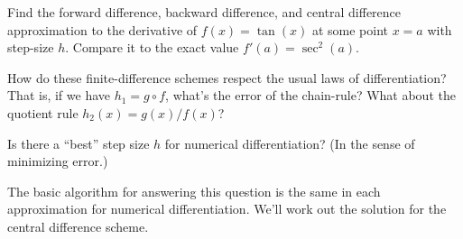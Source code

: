 \begin{xca}
  Find the forward difference, backward difference, and central
  difference approximation to the derivative of $f(x)=\tan(x)$ at some
  point $x=a$ with step-size $h$. Compare it to the exact value $f'(a)=\sec^{2}(a)$.
\end{xca}

\begin{xca}
  How do these finite-difference schemes respect the usual laws of
  differentiation? That is, if we have $h_{1} = g\circ f$, what's the error
  of the chain-rule? What about the quotient rule $h_{2}(x)=g(x)/f(x)$?
\end{xca}

\begin{puzzle}
Is there a ``best'' step size $h$ for numerical differentiation? (In the
sense of minimizing error.)
\end{puzzle}

The basic algorithm for answering this question is the same in each
approximation for numerical differentiation. We'll work out the solution
for the central difference scheme.

